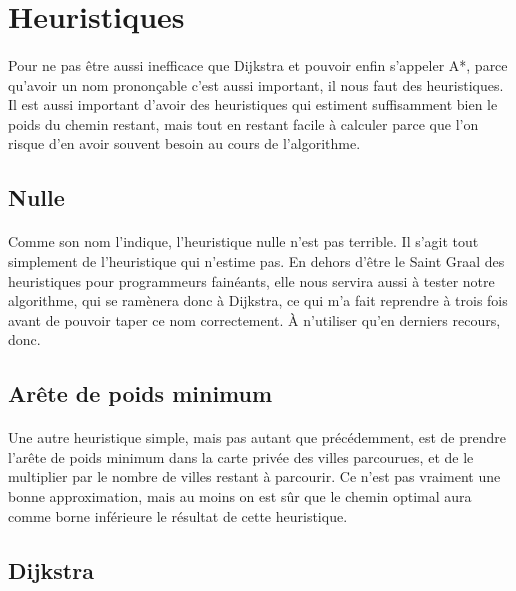 \documentclass[french]{article}
\begin{document}
\section{Heuristiques}

\paragraph{} Pour ne pas être aussi inefficace que Dijkstra et pouvoir enfin
s'appeler A*, parce qu'avoir un nom prononçable c'est aussi important, il nous
faut des heuristiques. Il est aussi important d'avoir des heuristiques qui
estiment suffisamment bien le poids du chemin restant, mais tout en restant
facile à calculer parce que l'on risque d'en avoir souvent besoin au cours de
l'algorithme.

\subsection{Nulle}

\paragraph{} Comme son nom l'indique, l'heuristique nulle n'est pas terrible.
Il s'agit tout simplement de l'heuristique qui n'estime pas. En dehors d'être
le Saint Graal des heuristiques pour programmeurs fainéants, elle nous servira
aussi à tester notre algorithme, qui se ramènera donc à Dijkstra, ce qui m'a
fait reprendre à trois fois avant de pouvoir taper ce nom correctement. À
n'utiliser qu'en derniers recours, donc.

\subsection{Arête de poids minimum}

\paragraph{} Une autre heuristique simple, mais pas autant que précédemment,
est de prendre l'arête de poids minimum dans la carte privée des villes
parcourues, et de le multiplier par le nombre de villes restant à parcourir. Ce
n'est pas vraiment une bonne approximation, mais au moins on est sûr que le
chemin optimal aura comme borne inférieure le résultat de cette heuristique.

\subsection{Dijkstra}
\end{document}
